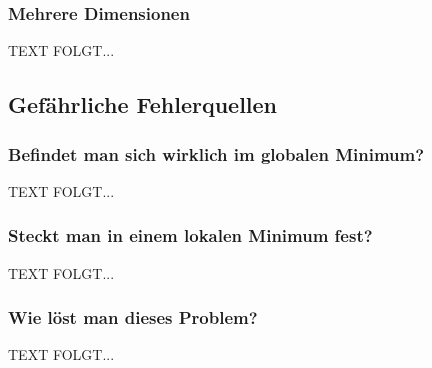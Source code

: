\subsubsection{Mehrere Dimensionen}\label{Abs.3}
  TEXT FOLGT...



\subsection{Gefährliche Fehlerquellen}\label{Fehlerquellen}
\subsubsection{Befindet man sich wirklich im globalen Minimum?}\label{Abs.1}
  TEXT FOLGT...

\subsubsection{Steckt man in einem lokalen Minimum fest?}\label{Abs.2}
  TEXT FOLGT...

\subsubsection{Wie löst man dieses Problem?}\label{Abs.3}
  TEXT FOLGT...


